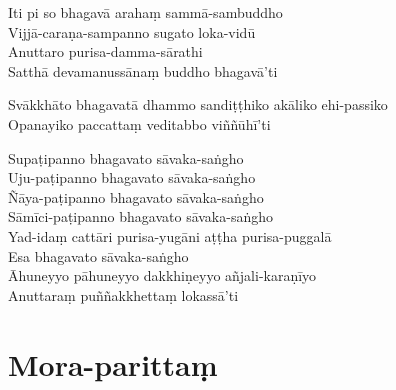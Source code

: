 \begin{paritta}
Iti pi so bhagavā arahaṃ sammā-sambuddho\\
Vijjā-caraṇa-sampanno sugato loka-vidū\\
Anuttaro purisa-damma-sārathi\\
Satthā devamanussānaṃ buddho bhagavā'ti

Svākkhāto bhagavatā dhammo sandiṭṭhiko akāliko ehi-passiko\\
Opanayiko paccattaṃ veditabbo viññūhī'ti

Supaṭipanno bhagavato sāvaka-saṅgho\\
Uju-paṭipanno bhagavato sāvaka-saṅgho\\
Ñāya-paṭipanno bhagavato sāvaka-saṅgho\\
Sāmīci-paṭipanno bhagavato sāvaka-saṅgho\\
Yad-idaṃ cattāri purisa-yugāni aṭṭha purisa-puggalā\\
Esa bhagavato sāvaka-saṅgho\\
Āhuneyyo pāhuneyyo dakkhiṇeyyo añjali-karaṇīyo\\
Anuttaraṃ puññakkhettaṃ lokassā'ti
\end{paritta}

\clearpage

\chapter{Mora-parittaṃ}%


